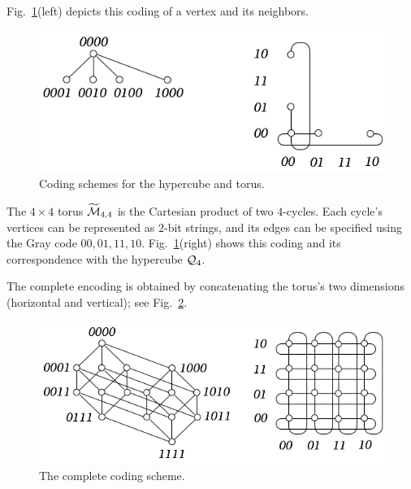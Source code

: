 \begin{itemize}
Fig.~\ref{fig:IsomorphismCodingPrinciple}(left) depicts this coding of a vertex and its neighbors.
 \begin{figure}[hbt]
\begin{center}
       \includegraphics[scale=0.4]{FiguresGraph/IsomorphismEx2}
       \caption{Coding schemes for the hypercube and torus.}
  \label{fig:IsomorphismCodingPrinciple}
\end{center}
\end{figure}

\smallskip

The $4 \times 4$ torus $\widetilde{\mbox{$\cal M$}}_{4,4}$ is the Cartesian product of two $4$-cycles.  Each cycle's vertices can be represented as $2$-bit strings, and its edges can be specified using the Gray code $00, 01, 11, 10$.  Fig.~\ref{fig:IsomorphismCodingPrinciple}(right) shows this coding and its correspondence with the hypercube $\mbox{$\cal Q$}_4$. 

The complete encoding is obtained by concatenating the torus's two dimensions (horizontal and vertical); see Fig.~\ref{fig:IsomorphismCodingComplete}.
\begin{figure}[hbt]
\begin{center}
       \includegraphics[scale=0.4]{FiguresGraph/IsomorphismEx1}
       \caption{The complete coding scheme.}
  \label{fig:IsomorphismCodingComplete}
\end{center}
\end{figure}


\end{itemize}
